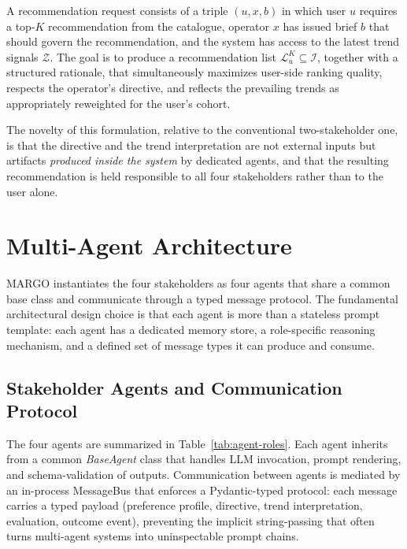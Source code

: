 \documentclass[master,english,final]{postech-ucs}
\begin{document}
A recommendation request consists of a triple $(u, x, b)$ in which user $u$ requires a top-$K$ recommendation from the catalogue, operator $x$ has issued brief $b$ that should govern the recommendation, and the system has access to the latest trend signals $\mathcal{Z}$.
The goal is to produce a recommendation list $\mathcal{L}^K_u \subseteq \mathcal{I}$, together with a structured rationale, that simultaneously maximizes user-side ranking quality, respects the operator's directive, and reflects the prevailing trends as appropriately reweighted for the user's cohort.

The novelty of this formulation, relative to the conventional two-stakeholder one, is that the directive and the trend interpretation are not external inputs but artifacts \emph{produced inside the system} by dedicated agents, and that the resulting recommendation is held responsible to all four stakeholders rather than to the user alone.


\section{Multi-Agent Architecture}

MARGO instantiates the four stakeholders as four agents that share a common base class and communicate through a typed message protocol.
The fundamental architectural design choice is that each agent is more than a stateless prompt template: each agent has a dedicated memory store, a role-specific reasoning mechanism, and a defined set of message types it can produce and consume.

\subsection{Stakeholder Agents and Communication Protocol}

The four agents are summarized in Table~\ref{tab:agent-roles}.
Each agent inherits from a common \emph{BaseAgent} class that handles LLM invocation, prompt rendering, and schema-validation of outputs.
Communication between agents is mediated by an in-process MessageBus that enforces a Pydantic-typed protocol: each message carries a typed payload (preference profile, directive, trend interpretation, evaluation, outcome event), preventing the implicit string-passing that often turns multi-agent systems into uninspectable prompt chains.
\end{document}
